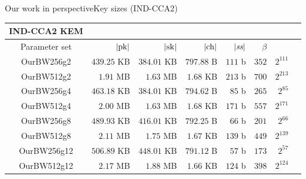 \documentclass[10pt]{beamer}
\begin{document}
\begin{frame}{Our work in perspective}{Key sizes (IND-CCA2)}

				\begin{table}[htbp]
								\centering
								\setlength{\tabcolsep}{2.7pt}
								\begin{tabular}{crrrrrrc}
												\toprule
												IND-CCA2 KEM & & & & & & & \\
												\midrule
												Parameter set & $|\pk|$ & $|\sk|$ & $|\ch|$ & $|\ss|$ & $\beta$ \\
												\midrule	
												OurBW256g2 & $ 439.25$ KB & $ 384.01$ KB & $ 797.88$ B & $111$ b & $352$ & $2^{111}$ \\
												OurBW512g2 & $ 1.91$ MB & $ 1.63$ MB & $ 1.68$ KB & $213$ b & $700$ & $2^{213}$ \\
												OurBW256g4 & $ 463.18$ KB & $ 384.01$ KB & $ 794.62$ B & $85$ b & $265$ & $2^{85}$ \\
												OurBW512g4 & $ 2.00$ MB & $ 1.63$ MB & $ 1.68$ KB & $171$ b & $557$ & $2^{171}$ \\
												OurBW256g8 & $ 489.93$ KB & $ 416.01$ KB & $ 792.25$ B & $66$ b & $201$ & $2^{66}$ \\
												OurBW512g8 & $ 2.11$ MB & $ 1.75$ MB & $ 1.67$ KB & $139$ b & $449$ & $2^{139}$ \\
												OurBW256g12 & $ 506.89$ KB & $ 448.01$ KB & $ 791.12$ B & $57$ b & $173$ & $2^{57}$ \\
												OurBW512g12 & $ 2.17$ MB & $ 1.88$ MB & $ 1.66$ KB & $124$ b & $398$ & $2^{124}$ \\
												\bottomrule
								\end{tabular}
				\end{table}

\end{frame}
\end{document}
